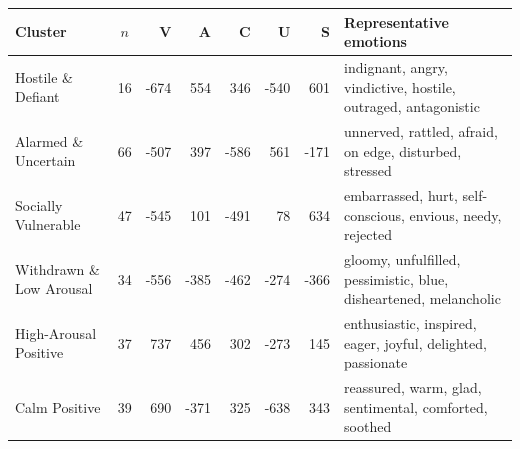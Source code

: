 \begin{tabularx}{\textwidth}{lcrrrrr>{\raggedright\arraybackslash}X}
\toprule
Cluster & $n$ & V & A & C & U & S & Representative emotions \\
\midrule
Hostile \& Defiant & 16 & -674 & 554 & 346 & -540 & 601 & indignant, angry, vindictive, hostile, outraged, antagonistic \\
Alarmed \& Uncertain & 66 & -507 & 397 & -586 & 561 & -171 & unnerved, rattled, afraid, on edge, disturbed, stressed \\
Socially Vulnerable & 47 & -545 & 101 & -491 & 78 & 634 & embarrassed, hurt, self-conscious, envious, needy, rejected \\
Withdrawn \& Low Arousal & 34 & -556 & -385 & -462 & -274 & -366 & gloomy, unfulfilled, pessimistic, blue, disheartened, melancholic \\
High-Arousal Positive & 37 & 737 & 456 & 302 & -273 & 145 & enthusiastic, inspired, eager, joyful, delighted, passionate \\
Calm Positive & 39 & 690 & -371 & 325 & -638 & 343 & reassured, warm, glad, sentimental, comforted, soothed \\
\bottomrule
\end{tabularx}
